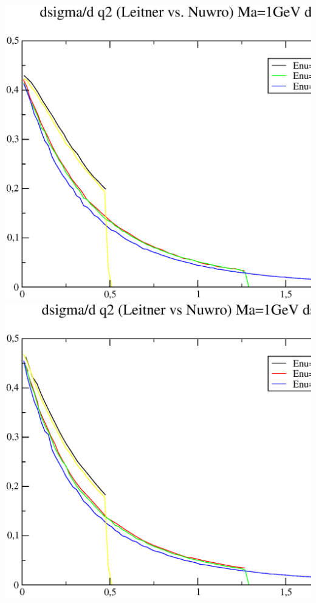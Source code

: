 \documentclass{article}
\begin{document}
\includegraphics[width=1\textwidth]{q2-proton.eps}
\includegraphics[width=1\textwidth]{q2-neutron.eps}
\end{document}
